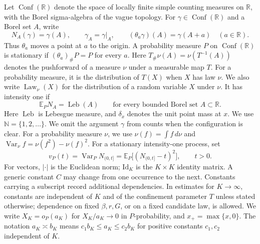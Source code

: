 \documentclass[11pt,reqno]{amsart}
\numberwithin{equation}{section}
\theoremstyle{definition}
\theoremstyle{remark}
\newcommand{\R}{\mathbb R}
\newcommand{\N}{\mathbb N}
\newcommand{\E}{\mathbb E}
\newcommand{\1}{\mathbf 1}
\newcommand{\Conf}{\operatorname{Conf}}
\newcommand{\Var}{\operatorname{Var}}
\newcommand{\Id}{\mathrm{Id}}
\newcommand{\Leb}{\operatorname{Leb}}
\DeclareMathOperator{\Law}{Law}
\newcommand{\dd}{\,d}
\begin{document}
Let $\Conf(\R)$ denote the space of locally finite simple counting
measures on $\R$, with the Borel sigma-algebra of the vague topology.
For $\gamma\in\Conf(\R)$ and a Borel set $A$, write
\[
N_A(\gamma)=\gamma(A),\qquad
\gamma_A=\gamma|_A,\qquad
(\theta_a\gamma)(A)=\gamma(A+a)\quad(a\in\R).
\]
Thus $\theta_a$ moves a point at $a$ to the origin. A probability measure
$P$ on $\Conf(\R)$ is stationary if $(\theta_a)_\#P=P$ for every $a$.
Here $T_\#\nu(A)=\nu(T^{-1}(A))$ denotes the pushforward of a
measure $\nu$ under a measurable map $T$. For a probability measure,
it is the distribution of $T(X)$ when $X$ has law $\nu$.
We also write $\Law_\nu(X)$ for the distribution of a random variable
$X$ under $\nu$.
It has intensity one if
\begin{equation}\label{eq:intensity-one}
\E_PN_A=\Leb(A)
\qquad\text{for every bounded Borel set }A\subset\R.
\end{equation}
Here $\Leb$ is Lebesgue measure, and $\delta_x$ denotes the unit
point mass at $x$. We use $\N=\{1,2,\ldots\}$. We omit the argument $\gamma$ from
counts when the configuration is clear. For a probability measure $\nu$,
we use $\nu(f)=\int f\dd\nu$ and $\Var_\nu f=\nu(f^2)-\nu(f)^2$.
For a stationary intensity-one process, set
\begin{equation}\label{eq:variance-definition}
v_P(t)=\Var_PN_{(0,t]}
      =\E_P\bigl[(N_{(0,t]}-t)^2\bigr],\qquad t>0.
\end{equation}
For vectors, $|\cdot|$ is the Euclidean norm; $\Id_K$ is the
$K\times K$ identity matrix. A generic constant $C$ may change from
one occurrence to the next. Constants carrying a subscript record
additional dependencies. In estimates for $K\to\infty$, constants are
independent of $K$ and of the confinement parameter $T$ unless stated
otherwise; dependence on fixed $\beta,r,G$, or on a fixed candidate law,
is allowed. We write $X_K=o_P(a_K)$ for $X_K/a_K\to0$ in
$P$-probability, and $x_+=\max\{x,0\}$. The notation
$a_K\asymp b_K$ means $c_1b_K\le a_K\le c_2b_K$ for positive
constants $c_1,c_2$ independent of $K$.
\end{document}
